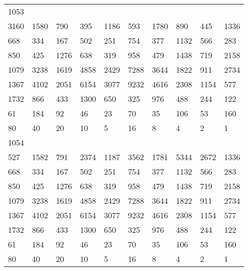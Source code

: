 \begin{longtable}{*{10}{l}}
1053&&&&&&&&&\\
3160& 1580& 790& 395& 1186& 593& 1780& 890& 445& 1336\\
668& 334& 167& 502& 251& 754& 377& 1132& 566& 283\\
850& 425& 1276& 638& 319& 958& 479& 1438& 719& 2158\\
1079& 3238& 1619& 4858& 2429& 7288& 3644& 1822& 911& 2734\\
1367& 4102& 2051& 6154& 3077& 9232& 4616& 2308& 1154& 577\\
1732& 866& 433& 1300& 650& 325& 976& 488& 244& 122\\
61& 184& 92& 46& 23& 70& 35& 106& 53& 160\\
80& 40& 20& 10& 5& 16& 8& 4& 2& 1\\

1054&&&&&&&&&\\
527& 1582& 791& 2374& 1187& 3562& 1781& 5344& 2672& 1336\\
668& 334& 167& 502& 251& 754& 377& 1132& 566& 283\\
850& 425& 1276& 638& 319& 958& 479& 1438& 719& 2158\\
1079& 3238& 1619& 4858& 2429& 7288& 3644& 1822& 911& 2734\\
1367& 4102& 2051& 6154& 3077& 9232& 4616& 2308& 1154& 577\\
1732& 866& 433& 1300& 650& 325& 976& 488& 244& 122\\
61& 184& 92& 46& 23& 70& 35& 106& 53& 160\\
80& 40& 20& 10& 5& 16& 8& 4& 2& 1\\


\end{longtable}
